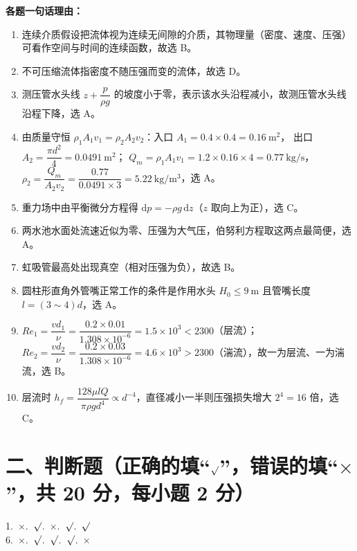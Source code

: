 \begin{tishi}
\textbf{各题一句话理由：}
\begin{enumerate}[label=\arabic*.,leftmargin=2.2em]
  \item 连续介质假设把流体视为连续无间隙的介质，其物理量（密度、速度、压强）可看作空间与时间的连续函数，故选 B。
  \item 不可压缩流体指密度不随压强而变的流体，故选 D。
  \item 测压管水头线 $z+\dfrac{p}{\rho g}$ 的坡度小于零，表示该水头沿程减小，故测压管水头线沿程下降，选 A。
  \item 由质量守恒 $\rho_1A_1v_1=\rho_2A_2v_2$：入口 $A_1=0.4\times0.4=0.16\ \mathrm{m^2}$，
        出口 $A_2=\dfrac{\pi d^2}{4}=0.0491\ \mathrm{m^2}$；
        $Q_m=\rho_1A_1v_1=1.2\times0.16\times4=0.77\ \mathrm{kg/s}$，
        $\rho_2=\dfrac{Q_m}{A_2v_2}=\dfrac{0.77}{0.0491\times3}=5.22\ \mathrm{kg/m^3}$，选 A。
  \item 重力场中由平衡微分方程得 $\mathrm{d}p=-\rho g\,\mathrm{d}z$（$z$ 取向上为正），选 C。
  \item 两水池水面处流速近似为零、压强为大气压，伯努利方程取这两点最简便，选 A。
  \item 虹吸管最高处出现真空（相对压强为负），故选 B。
  \item 圆柱形直角外管嘴正常工作的条件是作用水头 $H_0\le 9\ \mathrm{m}$ 且管嘴长度 $l=(3\sim 4)d$，选 A。
  \item $Re_1=\dfrac{vd_1}{\nu}=\dfrac{0.2\times0.01}{1.308\times10^{-6}}=1.5\times10^{3}<2300$（层流）；
        $Re_2=\dfrac{vd_2}{\nu}=\dfrac{0.2\times0.03}{1.308\times10^{-6}}=4.6\times10^{3}>2300$（湍流），故一为层流、一为湍流，选 B。
  \item 层流时 $h_f=\dfrac{128\mu lQ}{\pi\rho g d^{4}}\propto d^{-4}$，直径减小一半则压强损失增大 $2^{4}=16$ 倍，选 C。
\end{enumerate}
\end{tishi}

\section{二、判断题（正确的填“$\surd$”，错误的填“$\times$”，共 20 分，每小题 2 分）}

\begin{center}
1.~$\times$.~$\surd$.~$\times$.~$\surd$.~$\surd$\\[4pt]
6.~$\times$.~$\surd$.~$\surd$.~$\surd$.~$\times$
\end{center}

